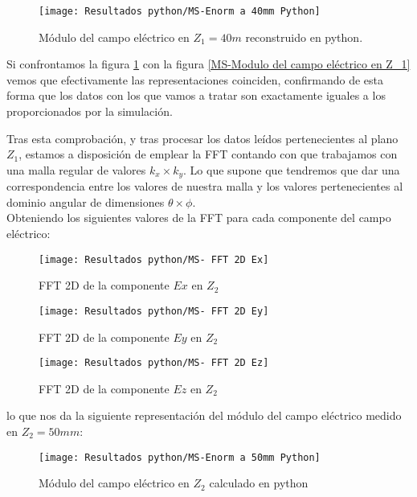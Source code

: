 \begin{figure}[h]
  \centering
    \texttt{[image: Resultados python/MS-Enorm a 40mm Python]}
    \caption{Módulo del campo eléctrico en $Z_1 = 40m$ reconstruido en python.}
    \label{MS-MS-Enorm a 40mm Python}
\end{figure}

Si confrontamos la figura \ref{MS-MS-Enorm a 40mm Python} con la figura \ref{MS-Modulo del campo eléctrico en Z_1} vemos que efectivamente las representaciones coinciden, confirmando de esta forma que los datos con los que vamos a tratar son exactamente iguales a los proporcionados por la simulación.\\

\newpage

Tras esta comprobación, y tras procesar los datos leídos pertenecientes al plano $Z_1$, estamos a disposición de emplear la FFT contando con que trabajamos con una malla regular de valores $k_{x}\times k_{y}$. Lo que supone que tendremos que dar una correspondencia entre los valores de nuestra malla y los valores pertenecientes al dominio angular de dimensiones $\theta \times \phi$.\\

Obteniendo los siguientes valores de la FFT para cada componente del campo eléctrico:

\begin{figure}[h]
  \centering
    \texttt{[image: Resultados python/MS- FFT 2D Ex]}
    \caption{FFT 2D de la componente $Ex$ en $Z_2$}
    \label{MS- FFT 2D Ex}
\end{figure}

\begin{figure}[h]
  \centering
    \texttt{[image: Resultados python/MS- FFT 2D Ey]}
    \caption{FFT 2D de la componente $Ey$ en $Z_2$}
    \label{MS- FFT 2D Ey}
\end{figure}

\newpage

\begin{figure}
  \centering
    \texttt{[image: Resultados python/MS- FFT 2D Ez]}
    \caption{FFT 2D de la componente $Ez$ en $Z_2$}
    \label{MS- FFT 2D Ez}
\end{figure}

lo que nos da la siguiente representación del módulo del campo eléctrico medido en $Z_2=50mm$:

\begin{figure}[h]
  \centering
    \texttt{[image: Resultados python/MS-Enorm a 50mm Python]}
    \caption{Módulo del campo eléctrico en $Z_2$ calculado en python}
    \label{MS-FFT 2D Ez}
\end{figure}


